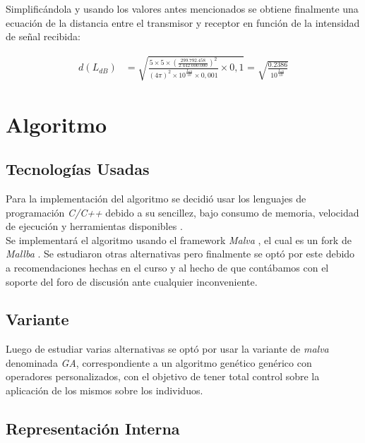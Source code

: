 \documentclass[journal]{IEEEtran}
\begin{document}
Simplificándola y usando los valores antes mencionados se obtiene finalmente una ecuación de la distancia entre el transmisor y receptor en función de la intensidad de señal recibida:

\begin{equation*}
\begin{split}
d(L_{dB}) &= \sqrt {\frac {5 \times 5 \times (\frac {299.792.458} {2.442.000.000})^2} {(4 \pi)^2 \times 10^{\frac {L_{dB}} {10}} \times 0,001} \times 0,1} = \sqrt {\frac {0.2386} {10^{\frac {L_{dB}} {10}}}}
\end{split}
\end{equation*}

\section{Algoritmo}

\subsection{Tecnologías Usadas}

Para la implementación del algoritmo se decidió usar los lenguajes de programación \emph{C/C++} \cite{c} \cite{c++} debido a su sencillez, bajo consumo de memoria, velocidad de ejecución y herramientas disponibles \cite{why:c:c++}.\\

Se implementará el algoritmo usando el framework \emph{Malva} \cite{malva}, el cual es un fork de \emph{Mallba} \cite{mallba}. Se estudiaron otras alternativas pero finalmente se optó por este debido a recomendaciones hechas en el curso y al hecho de que contábamos con el soporte del foro de discusión ante cualquier inconveniente.\\

\subsection{Variante}

Luego de estudiar varias alternativas se optó por usar la variante de \emph{malva} denominada \emph{GA}, correspondiente a un algoritmo genético genérico con operadores personalizados, con el objetivo de tener total control sobre la aplicación de los mismos sobre los individuos.\\

\subsection{Representación Interna}
\end{document}
